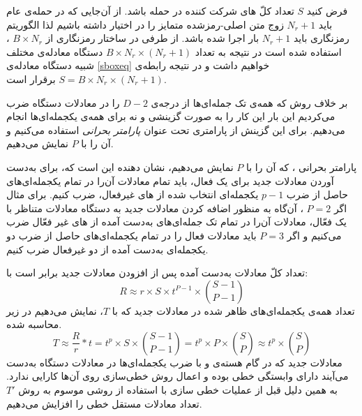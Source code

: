    فرض کنید 
   $S$
   تعداد کلّ 
   های شرکت کننده در حمله باشد. از آن‌جایی که در حمله‌ی 
   عام باید 
   $N_{r}+1$
   زوج متن اصلی-رمزشده متمایز را  در اختیار داشته باشیم  لذا  الگوریتم رمزنگاری باید 
   $N_{r}+1$
   بار اجرا شده باشد. از طرفی در ساختار رمزنگاری از 
   $B\times N_{r}$
   ،
   استفاده شده است در نتیجه به تعداد 
   $ B\times N_{r}\times (N_{r}+1)$
   دستگاه معادله‌ی مختلف شبیه دستگاه معادله‌ی
   \ref{sboxeq}
   خواهیم داشت و در نتیجه رابطه‌ی 
   $S = B\times N_{r}\times (N_{r}+1)$
   برقرار است.
   
   
   بر خلاف روش 
   که همه‌ی تک جمله‌ای‌ها از درجه‌ی 
   $D-2$
   را در معادلات دستگاه ضرب می‌کردیم این بار این کار  را به صورت گزینشی و نه برای همه‌ی یکجمله‌ای‌ها انجام می‌دهیم. برای این گزینش از پارامتری 
   تحت عنوان 
   \textit{پارامتر بحرانی}
    استفاده می‌کنیم و آن را با 
   $P$
   نمایش می‌دهیم.   
   
   \begin{definition}
   پارامتر بحرانی 
   ، که آن را با 
   	$P$
   	نمایش می‌دهیم، نشان دهنده‌ این است که، برای به‌دست  آوردن معادلات جدید برای یک 
   	فعال، باید تمام معادلات آن‌را در تمام یکجمله‌ای‌های حاصل از  ضرب 
   	$p-1$
   	یکجمله‌ای انتخاب شده از  
های غیرفعال،  ضرب کنیم. برای مثال اگر 
   	$P = 2$
   	، آن‌گاه به منظور اضافه کردن معادلات جدید به دستگاه معادلات متناظر با یک
   	فعّال، معادلات آن‌را در تمام تک جمله‌ای‌های به‌دست  آمده از 
   	های غیر فعّال  ضرب می‌کنیم و اگر 
   	$P = 3$
   	باید معادلات 
   	فعال را در  تمام یکجمله‌ای‌های حاصل از ضرب دو یکجمله‌ای به‌دست  آمده از دو 
   	غیرفعال ضرب کنیم.
   \end{definition}
   
   تعداد کلّ معادلات به‌دست  آمده پس از افزودن معادلات جدید برابر است با:
   $$R \approx r\times S\times t^{P-1}\times \binom{S-1}{P-1}$$
   تعداد همه‌ی یکجمله‌ای‌های ظاهر شده در معادلات جدید که با 
   $T$،
   نمایش می‌دهیم در زیر محاسبه شده. 
   $$T\approx \frac{R}{r}*t = t^{p}\times S\times \binom{S-1}{P-1} = t^{p}\times P\times\binom{S}{P} \approx t^{p}\times \binom{S}{P}$$
   معادلات جدید که در گام هسته‌ی 
   و با ضرب یکجمله‌ای‌ها در معادلات دستگاه به‌دست  می‌آیند دارای وابستگی خطی بوده و اعمال روش خطی‌سازی روی آن‌ها کارایی ندارد. به همین دلیل قبل از عملیات خطی سازی با استفاده از روشی موسوم به روش 
   $T'$
   تعداد معادلات مستقل خطی را افزایش می‌دهیم.
   
